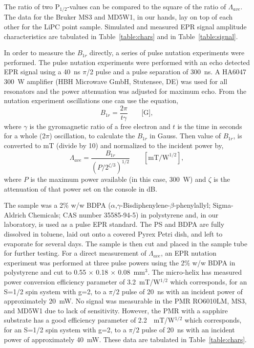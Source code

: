 The ratio of two P$_{1/2}$-values can be compared to the square of the ratio of $\Lambda_{ave}$. The data for the Bruker MS3 and MD5W1, in our hands, lay on top of each other for the LiPC point sample. Simulated and measured EPR signal amplitude characteristics are tabulated in Table~\ref{table:chars} and in Table~\ref{table:signal}. 

In order to measure the $B_{1r}$ directly, a series of pulse nutation experiments were performed. \cite{schweiger2001principles} The pulse nutation experiments were performed with an echo detected EPR signal using a 40~ns $\pi$/2 pulse and a pulse separation of 300~ns. A HA6047 300~W amplifier (HBH Microwave GmbH, Stutensee, DE) was used for all resonators and the power attenuation was adjusted for maximum echo. From the nutation experiment oscillations one can use the equation,
\begin{equation}
 B_{1r} = \frac{2 \pi}{t \gamma} \qquad \text{[G]},
\end{equation}
where $\gamma$ is the gyromagnetic ratio of a free electron and $t$ is the time in seconds for a whole ($2\pi$) oscillation, to calculate the  $B_{1r}$ in Gauss. Then value of $B_{1r}$, is converted to mT (divide by 10) and normalized to the incident power by,
\begin{equation}
\Lambda_{ave} = \frac{B_{1r}}{(P/2^{\zeta/3})^{1/2}}\qquad [\text{mT/W}^{1/2}],
\end{equation}
where $P$ is the maximum power available (in this case, 300~W) and $\zeta$ is the attenuation of that power set on the console in dB. 

The sample was a 2\% w/w BDPA ($\alpha$,$\gamma$-Bisdiphenylene-$\beta$-phenylallyl; Sigma-Aldrich Chemicals; CAS number 35585-94-5) in polystyrene and, in our laboratory, is used as a pulse EPR standard. The PS and BDPA are fully dissolved in toluene, laid out onto a covered Pyrex Petri dish, and left to evaporate for several days. The sample is then cut and placed in the sample tube for further testing. For a direct measurement of $\Lambda_{ave}$, an EPR nutation experiment was performed at three pulse powers using the 2\% w/w BDPA in polystyrene and cut to 0.55 $\times$ 0.18 $\times$ 0.08~mm$^3$. The micro-helix has measured power conversion efficiency parameter of 3.2~mT/W$^{1/2}$ which corresponds, for an S=1/2 spin system with g=2, to a $\pi/2$ pulse of 20~ns with an incident power of approximately 20~mW. No signal was measurable in the PMR RO6010LM, MS3, and MD5W1 due to lack of sensitivity. However, the PMR with a sapphire substrate has a good efficiency parameter of 2.2~~mT/W$^{1/2}$ which corresponds, for an S=1/2 spin system with g=2, to a $\pi/2$ pulse of 20~ns with an incident power of approximately 40~mW. These data are tabulated in Table~\ref{table:chars}.

